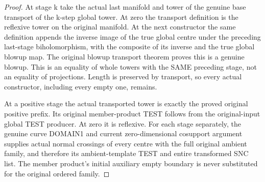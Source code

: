 \begin{proof}
At stage k take the actual last manifold and tower of the genuine base
transport of the k-step global tower. At zero the transport definition is
the reflexive tower on the original manifold. At the next constructor the
same definition appends the inverse image of the true global centre under
the preceding last-stage biholomorphism, with the composite of its inverse
and the true global blowup map. The original blowup transport theorem proves
this is a genuine blowup. This is an equality of whole towers with the SAME
preceding stage, not an equality of projections. Length is preserved by
transport, so every actual constructor, including every empty one, remains.

At a positive stage the actual transported tower is exactly the proved
original positive prefix. Its original member-product TEST follows from
the original-input global TEST producer. At zero it is reflexive. For each
stage separately, the genuine curve DOMAIN1 and current zero-dimensional
cosupport argument supplies actual normal crossings of every centre with
the full original ambient family, and therefore its ambient-template TEST
and entire transformed SNC list. The member product's initial auxiliary
empty boundary is never substituted for the original ordered family.
\end{proof}

